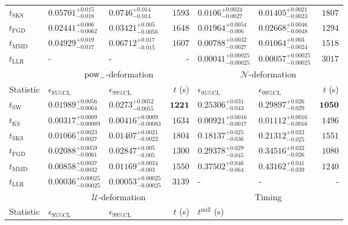 \begin{tabular}{l|llr|llr}
	$t_{\mathrm{SKS}}$ & $0.05701_{-0.018}^{+0.015}$ & $0.0746_{-0.014}^{+0.014}$ & $1593$ & $0.0106_{-0.0027}^{+0.0024}$ & $0.01405_{-0.0023}^{+0.0021}$ & $1807$ \\
	$t_{\mathrm{FGD}}$ & ${\mathbf{0.02441_{-0.0062}^{+0.006}}}$ & ${\mathbf{0.03421_{-0.0056}^{+0.005}}}$ & $1648$ & $0.01964_{-0.006}^{+0.0054}$ & $0.02668_{-0.0048}^{+0.0046}$ & $1294$ \\
	$t_{\mathrm{MMD}}$ & $0.04929_{-0.017}^{+0.019}$ & $0.06712_{-0.015}^{+0.017}$ & $1607$ & $0.00788_{-0.0027}^{+0.0032}$ & $0.01064_{-0.0024}^{+0.003}$ & $1518$ \\
	$t_{\mathrm{LLR}}$ & - & - & - & $0.00041_{-0.00025}^{+0.00025}$ & $0.00057_{-0.00025}^{+0.00025}$ & $3017$ \\
	\toprule
	\multicolumn{1}{c}{} & \multicolumn{3}{c}{$\rm{pow}_{-}$-deformation} & \multicolumn{3}{c}{$\mathcal{N}$-deformation} \\
	Statistic & $\epsilon_{95\%\mathrm{CL}}$ & $\epsilon_{99\%\mathrm{CL}}$ & $t$ (s) & $\epsilon_{95\%\mathrm{CL}}$ & $\epsilon_{99\%\mathrm{CL}}$ & $t$ (s) \\
	\midrule
	$t_{\mathrm{SW}}$ & $0.01989_{-0.0064}^{+0.0056}$ & $0.0273_{-0.0055}^{+0.0052}$ & ${\mathbf{1221}}$ & $0.25306_{-0.043}^{+0.031}$ & $0.29897_{-0.029}^{+0.026}$ & ${\mathbf{1050}}$ \\
	$t_{\overline{\mathrm{KS}}}$ & ${\mathbf{0.00317_{-0.00089}^{+0.0009}}}$ & ${\mathbf{0.00416_{-0.00083}^{+0.0009}}}$ & $1634$ & ${\mathbf{0.00921_{-0.0017}^{+0.0016}}}$ & ${\mathbf{0.01112_{-0.0016}^{+0.0016}}}$ & $1496$ \\
	$t_{\mathrm{SKS}}$ & $0.01066_{-0.0027}^{+0.0023}$ & $0.01407_{-0.0022}^{+0.0021}$ & $1804$ & $0.18137_{-0.036}^{+0.025}$ & $0.21312_{-0.025}^{+0.023}$ & $1551$ \\
	$t_{\mathrm{FGD}}$ & $0.02088_{-0.0061}^{+0.0059}$ & $0.02847_{-0.005}^{+0.005}$ & $1300$ & $0.29378_{-0.045}^{+0.029}$ & $0.34516_{-0.026}^{+0.022}$ & $1080$ \\
	$t_{\mathrm{MMD}}$ & $0.00858_{-0.0032}^{+0.0037}$ & $0.01169_{-0.003}^{+0.0034}$ & $1550$ & $0.37502_{-0.064}^{+0.046}$ & $0.43162_{-0.039}^{+0.041}$ & $1240$ \\
	$t_{\mathrm{LLR}}$ & $0.00036_{-0.00025}^{+0.00025}$ & $0.00053_{-0.00025}^{+0.00025}$ & $3139$ & - & - & - \\
	\toprule
	\multicolumn{1}{c}{} & \multicolumn{3}{c}{$\mathcal{U}$-deformation} & \multicolumn{3}{c}{Timing} \\
	Statistic & $\epsilon_{95\%\mathrm{CL}}$ & $\epsilon_{99\%\mathrm{CL}}$ & $t$ (s) & $t^{\mathrm{null}}$ (s) \\

\end{tabular}
